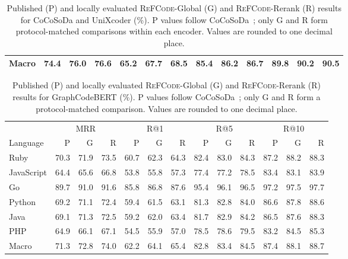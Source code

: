 \documentclass[11pt]{article}
\newcommand{\method}{\textsc{ReFCode}}
\begin{document}
\begin{table}[!t]
\begin{tabular*}{0.72\textwidth}{@{\extracolsep{\fill}}l*{12}{r}@{}}
    Macro      & 74.4 & 76.0 & 76.6 & 65.2 & 67.7 & 68.5 & 85.4 & 86.2 & 86.7 & 89.8 & 90.2 & 90.5 \\
    \bottomrule
  \end{tabular*}
  \caption{Published (P) and locally evaluated \method{}-Global (G) and \method{}-Rerank (R) results for CoCoSoDa and UniXcoder (\%). P values follow CoCoSoDa~\citep{CoCoSoDa}; only G and R form protocol-matched comparisons within each encoder. Values are rounded to one decimal place.}
  \label{tab:encoder_coco_unix_full}
\end{table}

\begin{table}[!t]
  \centering
  \scriptsize
  \setlength{\tabcolsep}{1.5pt}
  \renewcommand{\arraystretch}{0.92}
  \begin{tabular*}{0.72\textwidth}{@{\extracolsep{\fill}}l*{12}{r}@{}}
    \toprule
    & \multicolumn{3}{c}{MRR} & \multicolumn{3}{c}{R@1} & \multicolumn{3}{c}{R@5} & \multicolumn{3}{c}{R@10} \\
    \cmidrule(lr){2-4}\cmidrule(lr){5-7}\cmidrule(lr){8-10}\cmidrule(lr){11-13}
    Language & P & G & R & P & G & R & P & G & R & P & G & R \\
    \midrule
    Ruby       & 70.3 & 71.9 & 73.5 & 60.7 & 62.3 & 64.3 & 82.4 & 83.0 & 84.3 & 87.2 & 88.2 & 88.3 \\
    JavaScript & 64.4 & 65.6 & 66.8 & 53.8 & 55.8 & 57.3 & 77.4 & 77.2 & 78.5 & 83.4 & 83.1 & 83.9 \\
    Go         & 89.7 & 91.0 & 91.6 & 85.8 & 86.8 & 87.6 & 95.4 & 96.1 & 96.5 & 97.2 & 97.5 & 97.7 \\
    Python     & 69.2 & 71.1 & 72.4 & 59.4 & 61.5 & 63.1 & 81.3 & 82.8 & 84.0 & 86.6 & 87.8 & 88.6 \\
    Java       & 69.1 & 71.3 & 72.5 & 59.2 & 62.0 & 63.4 & 81.7 & 82.9 & 84.2 & 86.5 & 87.6 & 88.3 \\
    PHP        & 64.9 & 66.1 & 67.1 & 54.5 & 55.9 & 57.0 & 78.5 & 78.6 & 79.5 & 83.2 & 84.5 & 85.3 \\
    Macro      & 71.3 & 72.8 & 74.0 & 62.2 & 64.1 & 65.4 & 82.8 & 83.4 & 84.5 & 87.4 & 88.1 & 88.7 \\
    \bottomrule
  \end{tabular*}
  \caption{Published (P) and locally evaluated \method{}-Global (G) and \method{}-Rerank (R) results for GraphCodeBERT (\%). P values follow CoCoSoDa~\citep{CoCoSoDa}; only G and R form a protocol-matched comparison. Values are rounded to one decimal place.}
  \label{tab:encoder_graph_full}
\end{table}
\end{document}
